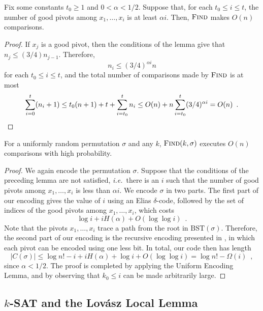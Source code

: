 \documentclass{patmorin}
\begin{document}
\begin{lem}
  Fix some constants $t_0 \geq 1$ and $0 < \alpha < 1/2$. Suppose
  that, for each $t_0 \leq i \leq t$, the number of good pivots among
  $x_1, \ldots, x_i$ is at least $\alpha i$. Then, $\textsc{Find}$
  makes $O(n)$ comparisons.
\end{lem}
\begin{proof}
  If $x_j$ is a good pivot, then the conditions of the lemma give
  that $n_j \le (3/4) n_{j - 1}$. Therefore,
  \[
  n_i \leq (3/4)^{\alpha i} n
  \]
  for each $t_0 \leq i \leq t$, and the total number of comparisons
  made by $\textsc{Find}$ is at most
  \[
  \sum_{i=0}^t (n_i + 1) \le t_0(n + 1) + t + \sum_{i=t_0}^t n_i \le
  O(n) + n \sum_{i = t_0}^t (3/4)^{\alpha i} = O(n) \enspace . \qedhere
  \]
\end{proof}

\begin{thm}
  For a uniformly random permutation $\sigma$ and any $k$,
  $\textsc{Find}(k, \sigma)$ executes $O(n)$ comparisons with high
  probability.
\end{thm}
\begin{proof}
  We again encode the permutation $\sigma$. Suppose that the
  conditions of the preceding lemma are not satisfied,
  \emph{i.e.}~there is an $i$ such that the number of good pivots
  among $x_1, \dots, x_i$ is less than $\alpha i$. We encode $\sigma$
  in two parts. The first part of our encoding gives the value of $i$
  using an Elias $\delta$-code, followed by the set of indices of the
  good pivots among $x_1, \dots, x_i$, which costs
  \[
  \log i + i H(\alpha) + O(\log \log i) \enspace .
  \]
  Note that the pivots $x_1, \dots, x_i$ trace a path from the root in
  $\text{BST}(\sigma)$. Therefore, the second part of our encoding is
  the recursive encoding presented in , in which each
  pivot can be encoded using one less bit. In total, our code then has
  length
  \[
    |C(\sigma)| \le \log n! - i + i H(\alpha) + \log i + O(\log \log
    i) = \log n! - \Omega(i) \enspace ,
  \]
  since $\alpha < 1/2$. The proof is completed by applying the Uniform
  Encoding Lemma, and by observing that $k_0 \leq i$ can be made
  arbitrarily large.
\end{proof}


\subsection{$k$-SAT and the Lov\'{a}sz Local Lemma}
\end{document}
